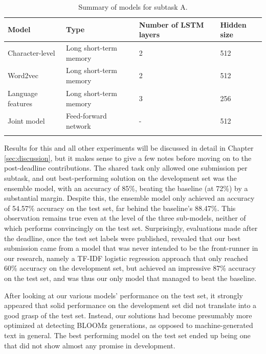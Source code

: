 \begin{table}[h]
    \centering
    \begin{tabular}{llll}
        \hline
        \textbf{Model}    & \textbf{Type}          & \textbf{Number of LSTM layers} & \textbf{Hidden size} \\
        \hline
        Character-level   & Long short-term memory & 2                              & 512                  \\
        Word2vec          & Long short-term memory & 2                              & 512                  \\
        Language features & Long short-term memory & 3                              & 256                  \\
        Joint model       & Feed-forward network   & -                              & 512                  \\
        \hline
        \vspace{0.1cm}
    \end{tabular}
    \caption{Summary of models for subtask A.}
    \label{tab:a_models}
\end{table}

Results for this and all other experiments will be discussed in detail in Chapter \ref{sec:discussion}, but it makes sense to give a few notes before moving on to the post-deadline contributions.
The shared task only allowed one submission per subtask, and out best-performing solution on the development set was the ensemble model, with an accuracy of 85\%, beating the baseline (at 72\%) by a substantial margin.
Despite this, the ensemble model only achieved an accuracy of 54.57\% accuracy on the test set, far behind the baseline's 88.47\%.
This observation remains true even at the level of the three sub-models, neither of which performs convincingly on the test set.
Surprisingly, evaluations made after the deadline, once the test set labels were published, revealed that our best submission came from a model that was never intended to be the front-runner in our research, namely a TF-IDF logistic regression approach that only reached 60\% accuracy on the development set, but achieved an impressive 87\% accuracy on the test set, and was thus our only model that managed to beat the baseline.

After looking at our various models' performance on the test set, it strongly appeared that solid performance on the development set did not translate into a good grasp of the test set.
Instead, our solutions had become presumably more optimized at detecting BLOOMz generations, as opposed to machine-generated text in general.
The best performing model on the test set ended up being one that did not show almost any promise in development.

